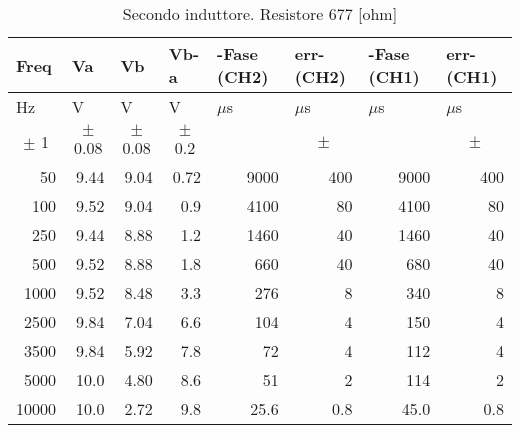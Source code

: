 \begin{table}[H]
\begin{center}
\begin{tabular}{|r|r|r|r|r|r|r|r|}
\hline
\multicolumn{1}{|l|}{Freq} & \multicolumn{1}{l|}{Va} & \multicolumn{1}{l|}{Vb} & \multicolumn{1}{l|}{Vb-a} & \multicolumn{1}{l|}{-Fase (CH2)} & \multicolumn{1}{l|}{err-(CH2)} & \multicolumn{1}{l|}{-Fase (CH1)} & \multicolumn{1}{l|}{err-(CH1)} \\ \hline
\multicolumn{1}{|l|}{Hz} & \multicolumn{1}{l|}{V} & \multicolumn{1}{l|}{V} & \multicolumn{1}{l|}{V} & \multicolumn{1}{l|}{$\mu$s} & \multicolumn{1}{l|}{$\mu$s} & \multicolumn{1}{l|}{$\mu$s} & \multicolumn{1}{l|}{$\mu$s} \\ \hline
\multicolumn{1}{|c|}{$\pm$ 1} & \multicolumn{1}{c|}{$\pm$ 0.08} & \multicolumn{1}{c|}{$\pm$ 0.08} & \multicolumn{1}{c|}{$\pm$ 0.2} & \multicolumn{1}{l|}{} & \multicolumn{1}{c|}{$\pm$ } & \multicolumn{1}{l|}{} & \multicolumn{1}{c|}{$\pm$ } \\ \hline
50 & 9.44 & 9.04 & 0.72& 9000 & 400 & 9000 & 400 \\ \hline
100 & 9.52 & 9.04 & 0.9 & 4100 & 80 & 4100 & 80 \\ \hline
250 & 9.44 & 8.88 & 1.2 & 1460 & 40 & 1460 & 40 \\ \hline
500 & 9.52 & 8.88 & 1.8 & 660 & 40 & 680 & 40 \\ \hline
1000 & 9.52 & 8.48 & 3.3 & 276 & 8 & 340 & 8 \\ \hline
2500 & 9.84 & 7.04 & 6.6 & 104 & 4 & 150 & 4 \\ \hline
3500 & 9.84 & 5.92 & 7.8 & 72 & 4 & 112 & 4 \\ \hline
5000 & 10.0 & 4.80 & 8.6 & 51 & 2 & 114 & 2 \\ \hline
10000 & 10.0 & 2.72 & 9.8 & 25.6 & 0.8 & 45.0 & 0.8 \\ \hline
\end{tabular}
\end{center}
\caption{Secondo induttore. Resistore 677 [ohm]}
\label{C3_P1_ind2}
\end{table}